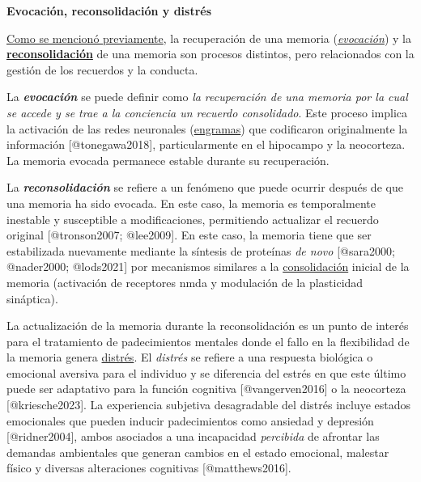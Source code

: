 \documentclass[
  11pt]{../MastersDoctoralThesisUNAM}
\begin{document}
\begin{tcolorbox}[enhanced jigsaw, colframe=quarto-callout-note-color-frame, left=2mm, bottomrule=.15mm, rightrule=.15mm, arc=.35mm, toprule=.15mm, leftrule=.75mm, breakable, opacityback=0, colback=white]

\vspace{-3mm}\textbf{\textbf{Evocación, reconsolidación y distrés}}\vspace{3mm}

\hyperref[callout-trazamultiple]{Como se mencionó previamente}, la
recuperación de una memoria
(\href{AppendixB.qmd\#term-id-12}{\emph{evocación}}) y la
\href{AppendixB.qmd\#term-id-11}{\textbf{reconsolidación}} de una
memoria son procesos distintos, pero relacionados con la gestión de los
recuerdos y la conducta.

La \textbf{\emph{evocación}} se puede definir como \emph{la recuperación
de una memoria por la cual se accede y se trae a la conciencia un
recuerdo consolidado}. Este proceso implica la activación de las redes
neuronales (\href{AppendixB.qmd\#term-id-1}{engramas}) que codificaron
originalmente la información {[}@tonegawa2018{]}, particularmente en el
hipocampo y la neocorteza. La memoria evocada permanece estable durante
su recuperación.

La \textbf{\emph{reconsolidación}} se refiere a un fenómeno que puede
ocurrir después de que una memoria ha sido evocada. En este caso, la
memoria es temporalmente inestable y susceptible a modificaciones,
permitiendo actualizar el recuerdo original {[}@tronson2007;
@lee2009{]}. En este caso, la memoria tiene que ser estabilizada
nuevamente mediante la síntesis de proteínas \emph{de novo}
{[}@sara2000; @nader2000; @lods2021{]} por mecanismos similares a la
\href{AppendixB.qmd\#term-id-11}{consolidación} inicial de la memoria
(activación de receptores \ac{nmda} y modulación de la plasticidad
sináptica).

La actualización de la memoria durante la reconsolidación es un punto de
interés para el tratamiento de padecimientos mentales donde el fallo en
la flexibilidad de la memoria genera
\href{AppendixB.qmd\#term-id-18}{distrés}. El \emph{distrés} se refiere
a una respuesta biológica o emocional aversiva para el individuo y se
diferencia del estrés en que este último puede ser adaptativo para la
función cognitiva {[}@vangerven2016{]} o la neocorteza
{[}@kriesche2023{]}. La experiencia subjetiva desagradable del distrés
incluye estados emocionales que pueden inducir padecimientos como
ansiedad y depresión {[}@ridner2004{]}, ambos asociados a una
incapacidad \emph{percibida} de afrontar las demandas ambientales que
generan cambios en el estado emocional, malestar físico y diversas
alteraciones cognitivas {[}@matthews2016{]}.

\end{tcolorbox}
\end{document}
